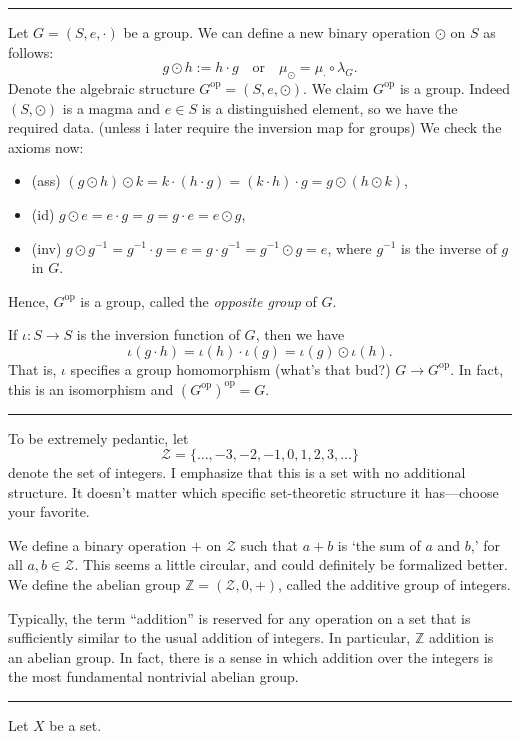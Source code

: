 \documentclass[12pt]{article}
\newcommand{\sepline}{\rule{\textwidth}{0.4pt}}
\theoremstyle{definition}
\newcommand{\isp}[1]{\quad\text{#1}\quad}
\newcommand{\Z}{\mathbb{Z}}
\newcommand{\ZZ}{\mathcal{Z}}
\newcommand{\<}{\left\langle}
\renewcommand{\>}{\right\rangle}
\newcommand{\op}{\mathrm{op}}
\begin{document}
\sepline

Let $G = (S, e, \cdot)$ be a group.
We can define a new binary operation $\odot$ on $S$ as follows:
\[
    g \odot h := h \cdot g \isp{or} \mu_\odot = \mu_\cdot \circ \lambda_G.
\]
Denote the algebraic structure $G^\op = (S, e, \odot)$.
We claim $G^\op$ is a group.
Indeed $(S, \odot)$ is a magma and $e \in S$ is a distinguished element, so we have the required data. (unless i later require the inversion map for groups)
We check the axioms now:
\begin{itemize}[nosep]
    \item (ass) $(g \odot h) \odot k = k \cdot (h \cdot g) = (k \cdot h) \cdot g = g \odot (h \odot k)$,
    \item (id) $g \odot e = e \cdot g = g = g \cdot e = e \odot g$,
    \item (inv) $g \odot g^{-1} = g^{-1} \cdot g = e = g \cdot g^{-1} = g^{-1} \odot g = e$, where $g^{-1}$ is the inverse of $g$ in $G$. 
\end{itemize}
Hence, $G^\op$ is a group, called the \emph{opposite group} of $G$.

If $\iota : S \to S$ is the inversion function of $G$, then we have
\[
    \iota(g \cdot h) = \iota(h) \cdot \iota(g) = \iota(g) \odot \iota(h).
\]
That is, $\iota$ specifies a group homomorphism (what's that bud?) $G \to G^\op$.
In fact, this is an isomorphism and $(G^\op)^\op = G$.


\sepline

To be extremely pedantic, let
\[
    \ZZ = \{\dots, -3, -2, -1, 0, 1, 2, 3, \dots\}
\]
denote the set of integers.
I emphasize that this is a set with no additional structure.
It doesn't matter which specific set-theoretic structure it has---choose your favorite.

We define a binary operation $+$ on $\ZZ$ such that $a + b$ is `the sum of $a$ and $b$,' for all $a, b \in \ZZ$.
This seems a little circular, and could definitely be formalized better.
We define the abelian group $\Z = (\ZZ, 0, +)$, called the additive group of integers.

Typically, the term ``addition'' is reserved for any operation on a set that is sufficiently similar to the usual addition of integers.
In particular, $\Z$ addition is an abelian group.
In fact, there is a sense in which addition over the integers is the most fundamental nontrivial abelian group.



\sepline

Let $X$ be a set.
\end{document}

